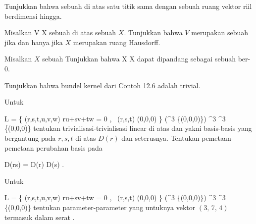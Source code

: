 \setcounter{section}{12}

{}
{

Tunjukkan bahwa sebuah
di atas satu titik
 {} {}
sama dengan sebuah ruang vektor riil berdimensi hingga.

}
{} {}

{}
{

Misalkan
 { V } { X
} {}
sebuah
di atas sebuah
$X$. Tunjukkan bahwa $V$ merupakan sebuah
jika dan hanya jika $X$ merupakan ruang Hausdorff.

}
{} {}

{}
{

Misalkan $X$ sebuah
Tunjukkan bahwa
 { X } { X
} {}
dapat dipandang sebagai sebuah
ber-
$0$.

}
{} {}

{}
{

Tunjukkan bahwa bundel kernel dari
Contoh 12.6
adalah trivial.

}
{} {}

{}
{

Untuk

\mavergleichskettealign
{\vergleichskettealign
{L
}
{ =} { \left\{ (r,s,t,u,v,w)  \mid  ru+sv+tw = 0 , \, (r,s,t) \neq (0,0,0)       \right\}
}
{ \subseteq} { (\R^3 \setminus \{(0,0,0)\}) \times \R^3
}
{ \longrightarrow} { \R^3 \setminus \{(0,0,0)\}
}
{ } {
}
}
{}{}{}
tentukan trivialisasi-trivialisasi linear di atas
 dan
 yakni basis-basis yang bergantung pada $r,s,t$ di atas $D(r)$ dan seterusnya. Tentukan pemetaan-pemetaan perubahan basis pada

\mavergleichskette
{\vergleichskette
{D(rs)
}
{ = }{ D(r) \cap D(s)
}
{  }{
}
{    }{
}
{   }{
}
}
{}{}{.}

}
{} {}

{}
{

Untuk

\mavergleichskettealign
{\vergleichskettealign
{L
}
{ =} { \left\{ (r,s,t,u,v,w)  \mid  ru+sv+tw = 0 , \, (r,s,t) \neq (0,0,0)       \right\}
}
{ \subseteq} { (\R^3 \setminus \{(0,0,0)\}) \times \R^3
}
{ \longrightarrow} { \R^3 \setminus \{(0,0,0)\}
}
{ } {
}
}
{}{}{}
tentukan parameter-parameter
 yang untuknya vektor $\left(  3   , \,   7  , \,   4                 \right)$ termasuk dalam serat
.

}
{} {}

